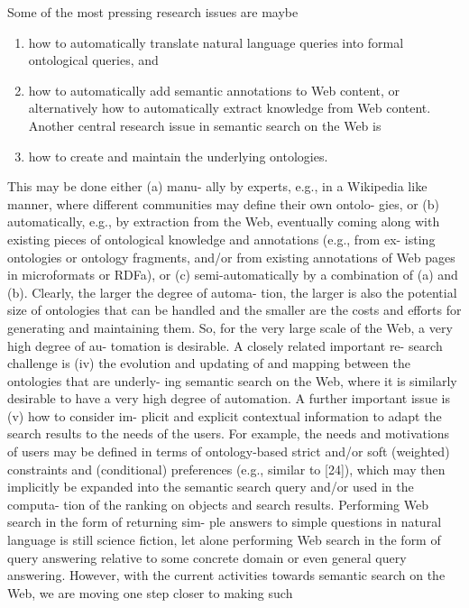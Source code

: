 \documentclass[12pt,a4]{article}
\begin{document}
 Some of the most pressing research issues are maybe 
\begin{enumerate}
\item how to automatically translate natural language queries into formal ontological queries, and 
\item how to automatically add semantic annotations to Web content, or alternatively how to automatically extract knowledge from Web content. 
Another central research issue in semantic search on the Web is 
\item how to create and maintain the underlying ontologies. 
\end{enumerate}This may be done either (a) manu-
ally by experts, e.g., in a Wikipedia like manner, where
different communities may define their own ontolo-
gies, or (b) automatically, e.g., by extraction from the
Web, eventually coming along with existing pieces of
ontological knowledge and annotations (e.g., from ex-
isting ontologies or ontology fragments, and/or from
existing annotations of Web pages in microformats or
RDFa), or (c) semi-automatically by a combination
of (a) and (b). Clearly, the larger the degree of automa-
tion, the larger is also the potential size of ontologies
that can be handled and the smaller are the costs and
efforts for generating and maintaining them. So, for the
very large scale of the Web, a very high degree of au-
tomation is desirable. A closely related important re-
search challenge is (iv) the evolution and updating of
and mapping between the ontologies that are underly-
ing semantic search on the Web, where it is similarly
desirable to have a very high degree of automation.
A further important issue is (v) how to consider im-
plicit and explicit contextual information to adapt the
search results to the needs of the users. For example,
the needs and motivations of users may be defined in
terms of ontology-based strict and/or soft (weighted)
constraints and (conditional) preferences (e.g., similar
to [24]), which may then implicitly be expanded into
the semantic search query and/or used in the computa-
tion of the ranking on objects and search results.
Performing Web search in the form of returning sim-
ple answers to simple questions in natural language is
still science fiction, let alone performing Web search in
the form of query answering relative to some concrete
domain or even general query answering. However,
with the current activities towards semantic search on
the Web, we are moving one step closer to making such
\end{document}
